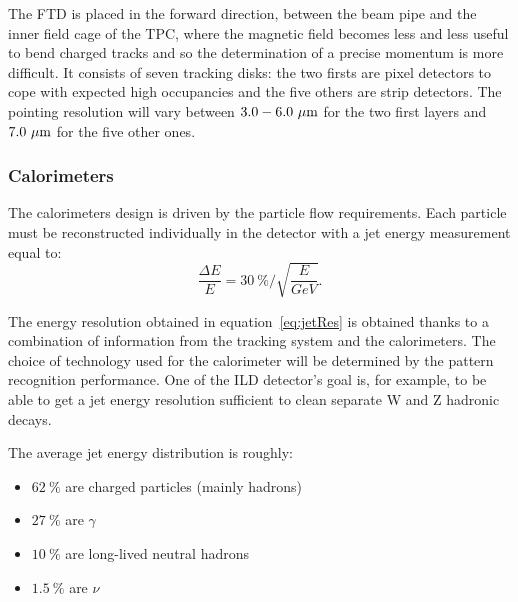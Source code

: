      The \gls{FTD} is placed in the forward direction, between the beam pipe and the inner field cage of the \gls{TPC}, where the magnetic field becomes less and less useful to bend charged tracks and so the determination of a precise momentum is more difficult.
     It consists of seven tracking disks: the two firsts are pixel detectors to cope with expected high occupancies and the five others are strip detectors.
     The pointing resolution will vary between $3.0-6.0~\rm{\mu m}$ for the two first layers and $7.0~\rm{\mu m}$ for the five other ones.
     


      \subsubsection{Calorimeters}

      The calorimeters design is driven by the particle flow requirements.
      Each particle must be reconstructed individually in the detector with a jet energy measurement equal to:
      \begin{equation}
        \frac{\Delta E}{E} = 30~\% / \sqrt{\frac{E}{GeV}}.
        \label{eq:jetRes}
      \end{equation}

      The energy resolution obtained in equation~\ref{eq:jetRes} is obtained thanks to a combination of information from the tracking system and the calorimeters. 
      The choice of technology used for the calorimeter will be determined by the pattern recognition performance. 
      One of the \gls{ILD} detector's goal is, for example, to be able to get a jet energy resolution sufficient to clean separate W and Z hadronic decays.
      
      The average jet energy distribution is roughly: 
      \begin{itemize}
        \item $62~\%$ are charged particles (mainly hadrons)
        \item $27~\%$ are $\gamma$
        \item $10~\%$ are long-lived neutral hadrons
        \item $1.5~\%$ are $\nu$
      \end{itemize}

